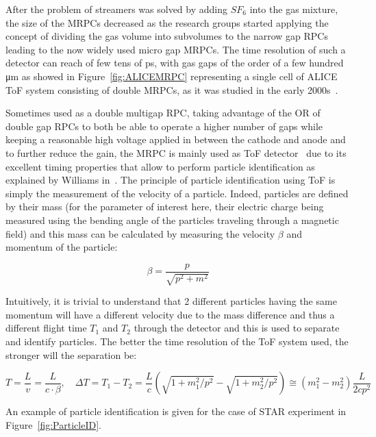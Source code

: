 	After the problem of streamers was solved by adding $SF_6$ into the gas mixture, the size of the MRPCs decreased as the research groups started applying the concept of dividing the gas volume into subvolumes to the narrow gap RPCs leading to the now widely used micro gap MRPCs. The time resolution of such a detector can reach of few tens of \si{ps}, with gas gaps of the order of a few hundred \si{\micro m} as showed in Figure~\ref{fig:ALICEMRPC} representing a single cell of ALICE \acf{ToF} system consisting of double MRPCs, as it was studied in the early 2000s~\cite{ALICE2002}.
	
	Sometimes used as a double multigap RPC, taking advantage of the OR of double gap RPCs to both be able to operate a higher number of gaps while keeping a reasonable high voltage applied in between the cathode and anode and to further reduce the gain, the MRPC is mainly used as ToF detector~\cite{ALICE2002,START2002,BESIII2014,CBM2007,MPD2016} due to its excellent timing properties that allow to perform particle identification as explained by Williams in~\cite{WILLIAMS2012}. The principle of particle identification using ToF is simply the measurement of the velocity of a particle. Indeed, particles are defined by their mass (for the parameter of interest here, their electric charge being measured using the bending angle of the particles traveling through a magnetic field) and this mass can be calculated by measuring the velocity $\beta$ and momentum of the particle:
	
	\begin{equation}
		\beta = \frac{p}{\sqrt{p^2 + m^2}}
	\end{equation}
	
	Intuitively, it is trivial to understand that 2 different particles having the same momentum will have a different velocity due to the mass difference and thus a different flight time $T_1$ and $T_2$ through the detector and this is used to separate and identify particles. The better the time resolution of the ToF system used, the stronger will the separation be:
	
	\begin{equation}
		T = \frac{L}{v} = \frac{L}{c\cdot\beta}, \quad \Delta T = T_1 - T_2 = \frac{L}{c}\left(\sqrt{1+m_1^2/p^2} - \sqrt{1+m_2^2/p^2}\right) \cong (m_1^2 - m_2^2)\frac{L}{2cp^2}
	\end{equation}
	
	An example of particle identification is given for the case of STAR experiment in Figure~\ref{fig:ParticleID}.
	
